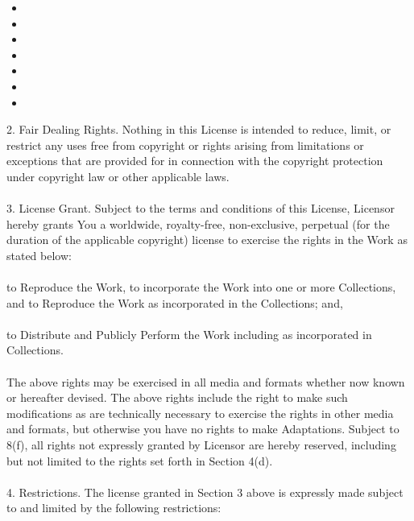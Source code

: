 \begin{itemize}
  \item {} 

  \item {} 

  \item {} 

  \item {} 

  \item {} 

  \item {} 

  \item {} 

\end{itemize}

2. Fair Dealing Rights. Nothing in this License is intended to reduce, limit, or
restrict any uses free from copyright or rights arising from limitations or
exceptions that are provided for in connection with the copyright protection
under copyright law or other applicable laws.
\\ \\
3. License Grant. Subject to the terms and conditions of this License, Licensor
hereby grants You a worldwide, royalty-free, non-exclusive, perpetual (for the
duration of the applicable copyright) license to exercise the rights in the Work
as stated below:
\\ \\
    to Reproduce the Work, to incorporate the Work into one or more Collections,
    and to Reproduce the Work as incorporated in the Collections; and, \\ \\
     to
    Distribute and Publicly Perform the Work including as incorporated in
    Collections.
\\ \\
The above rights may be exercised in all media and formats whether now known or
hereafter devised. The above rights include the right to make such modifications
as are technically necessary to exercise the rights in other media and formats,
but otherwise you have no rights to make Adaptations. Subject to 8(f), all
rights not expressly granted by Licensor are hereby reserved, including but not
limited to the rights set forth in Section 4(d).
\\ \\
4. Restrictions. The license granted in Section 3 above is expressly made
subject to and limited by the following restrictions:
\\ \\
